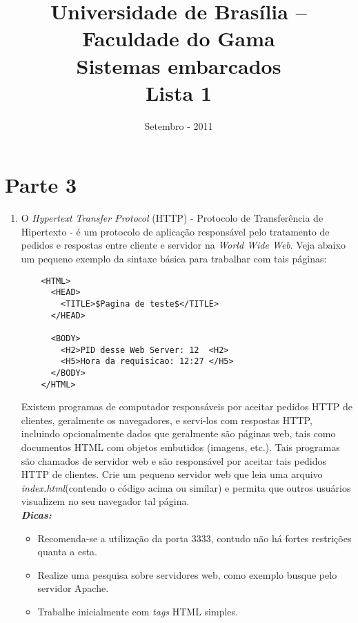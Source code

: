 \documentclass[a4paper,10pt]{article}
\title{ \textbf{Universidade de Brasília -- Faculdade do Gama \\ Sistemas embarcados \\ Lista 1 }}
\date{Setembro - 2011}
\begin{document}
\maketitle

\section{Parte 3}
  \begin{enumerate}

   \item O \emph{Hypertext Transfer Protocol} (HTTP) - Protocolo de Transferência de Hipertexto - é um protocolo de aplicação responsável pelo tratamento 
	de pedidos e respostas entre cliente e servidor na \emph{World Wide Web}. Veja abaixo um pequeno exemplo da sintaxe básica para trabalhar com 
	tais páginas:\\
\begin{verbatim}
 	<HTML>
	  <HEAD>
	    <TITLE>$Pagina de teste$</TITLE>
	  </HEAD>
          
	  <BODY>
	    <H2>PID desse Web Server: 12  <H2>
	    <H5>Hora da requisicao: 12:27 </H5>
	  </BODY>
	</HTML>
\end{verbatim}
	Existem programas de computador responsáveis por aceitar pedidos HTTP de clientes, geralmente os navegadores, e servi-los com respostas HTTP,
	incluindo opcionalmente dados que geralmente são páginas web, tais como documentos HTML com objetos embutidos (imagens, etc.). Tais programas 
	são chamados de servidor web e são responsável por aceitar tais pedidos HTTP de clientes. Crie um pequeno servidor web que leia uma arquivo 
	\emph{index.html}(contendo o código acima ou similar) e permita que outros usuários visualizem no seu navegador tal página. \\
	\textbf{\emph{Dicas:}}
	\begin{itemize}
	 \item Recomenda-se a utilização da porta 3333, contudo não há fortes restrições quanta a esta.
	 \item Realize uma pesquisa sobre servidores web, como exemplo busque pelo servidor Apache.
	 \item Trabalhe inicialmente com \emph{tags} HTML simples.
	\end{itemize}


\end{enumerate}
\end{document}

